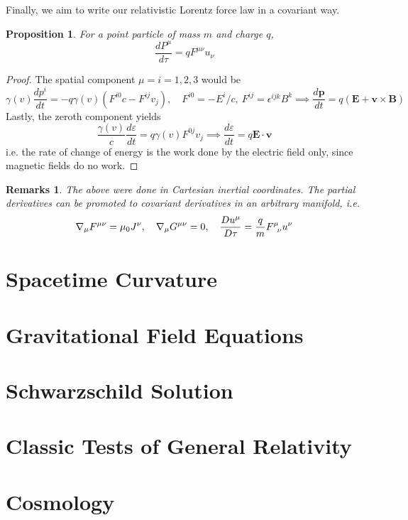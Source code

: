 \documentclass[a4paper]{article}
\newtheorem{remarks}{Remarks}[section]
\theoremstyle{new}
\newtheorem{prop}{Proposition}[section]
\begin{document}
Finally, we aim to write our relativistic Lorentz force law in a covariant way. 
\begin{prop}
For a point particle of mass $m$ and charge $q$,
$$\frac{dP^\mu}{d\tau}=qF^{\mu\nu}u_\nu$$
\end{prop}
\begin{proof}
The spatial component $\mu=i=1,2,3$ would be
$$\gamma(v)\frac{dp^i}{dt}=-q\gamma(v)(F^{i0}c-F^{ij}v_j),\quad F^{i0}=-E^i/c,~F^{ij}=\epsilon^{ijk}B^k\implies\frac{d\mathbf{p}}{dt}=q(\mathbf{E}+\mathbf{v}\times\mathbf{B})$$
Lastly, the zeroth component yields
$$\frac{\gamma(v)}{c}\frac{d\varepsilon}{dt}=q\gamma(v)F^{0j}v_j\implies\frac{d\varepsilon}{dt}=q\mathbf{E}\cdot\mathbf{v}$$
i.e. the rate of change of energy is the work done by the electric field only, since magnetic fields do no work.
\end{proof}
\begin{remarks}
The above were done in Cartesian inertial coordinates. The partial derivatives can be promoted to covariant derivatives in an arbitrary manifold, i.e.
$$\nabla_\mu F^{\mu\nu}=\mu_0 J^\nu,\quad \nabla_\mu G^{\mu\nu}=0,\quad\frac{Du^\mu}{D\tau}=\frac{q}{m}\tensor*{F}{*_{}^{\mu}_{\nu}}u^\nu$$
\end{remarks}
\newpage
\section{Spacetime Curvature}
\newpage
\section{Gravitational Field Equations}
\newpage
\section{Schwarzschild Solution}
\newpage
\section{Classic Tests of General Relativity}
\newpage
\section{Cosmology}
\end{document}

